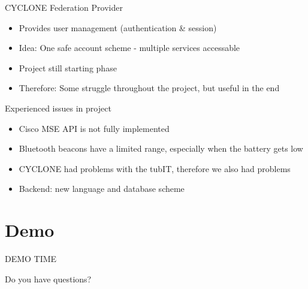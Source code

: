 \documentclass[11pt]{beamer}
\begin{document}
\begin{frame}{CYCLONE Federation Provider}

    \begin{itemize}

      \item Provides user management (authentication \& session)
      \item Idea: One safe account scheme - multiple services accessable
      \item Project still starting phase
      \item Therefore: Some struggle throughout the project, but useful in the end

    \end{itemize}

\end{frame}

\begin{frame}{Experienced issues in project}

  \begin{itemize}
    \item Cisco MSE API is not fully implemented
    \item Bluetooth beacons have a limited range, especially when the battery gets low
    \item CYCLONE had problems with the tubIT, therefore we also had problems
    \item Backend: new language and database scheme
  \end{itemize}
\end{frame}

\section{Demo}

\begin{frame}{}

  \begin{center}

    {\Huge DEMO TIME}

    \end{center}

\end{frame}

\begin{frame}{}

	\begin{center}

		{\Huge Do you have questions?}

    \end{center}

\end{frame}
\end{document}
